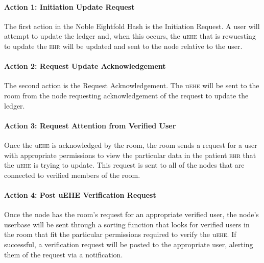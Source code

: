     \paragraph{Action 1: Initiation Update Request}
    The first action in the Noble Eightfold Hash is the Initiation Request. A user will attempt to update the ledger and, when this occurs, the u\textsc{ehe} that is rewuesting to update the \textsc{ehr} will be updated and sent to the node relative to the user.%

    \paragraph{Action 2: Request Update Acknowledgement}
    The second action is the Request Acknowledgement. The u\textsc{ehe} will be sent to the room from the node requesting acknowledgement of the request to update the ledger.%

    \paragraph{Action 3: Request Attention from Verified User}
    Once the u\textsc{ehe} is acknowledged by the room, the room sends a request for a user with appropriate permissions to view the particular data in the patient \textsc{ehr} that the u\textsc{ehe} is trying to update. This request is sent to all of the nodes that are connected to verified members of the room.%

    \paragraph{Action 4: Post uEHE Verification Request}
    Once the node has the room's request for an appropriate verified user, the node’s userbase will be sent through a sorting function that looks for verified users in the room that fit the particular permissions required to verify the u\textsc{ehe}. If successful, a verification request will be posted to the appropriate user, alerting them of the request via a notification.%


